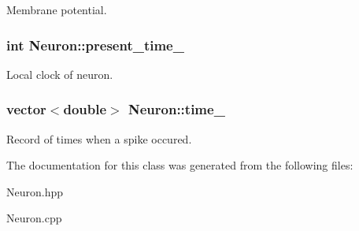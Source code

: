 Membrane potential. \hypertarget{classNeuron_a548aa19e97c22a209419f8e14aaf0d72}{
\subsubsection[{present\-\_\-time\-\_\-}]{\setlength{\rightskip}{0pt plus 5cm}int Neuron\-::present\-\_\-time\-\_\-\hspace{0.3cm}{\ttfamily [private]}}}\label{classNeuron_a548aa19e97c22a209419f8e14aaf0d72}
Local clock of neuron. \hypertarget{classNeuron_a7674c161dce2a7990b2ae2ebaa638ff6}{
\subsubsection[{time\-\_\-}]{\setlength{\rightskip}{0pt plus 5cm}vector$<$double$>$ Neuron\-::time\-\_\-\hspace{0.3cm}{\ttfamily [private]}}}\label{classNeuron_a7674c161dce2a7990b2ae2ebaa638ff6}
Record of times when a spike occured. 

The documentation for this class was generated from the following files\-:\begin{DoxyCompactItemize}
\item 
Neuron.\-hpp\item 
Neuron.\-cpp\end{DoxyCompactItemize}
